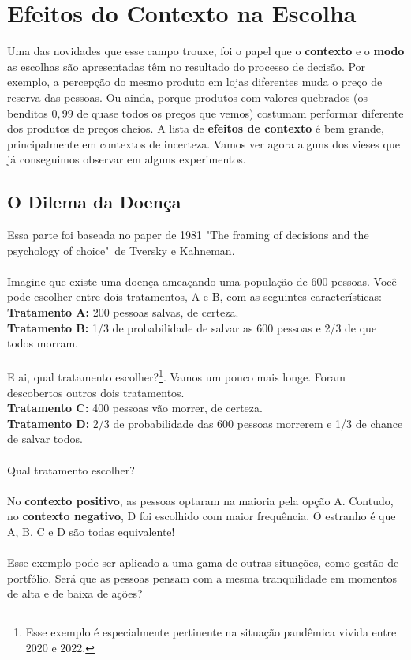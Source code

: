 \documentclass[a4paper,11pt,oneside]{book}
\theoremstyle{definition}
\theoremstyle{break}
\begin{document}
\section{Efeitos do Contexto na Escolha}

Uma das novidades que esse campo trouxe, foi o papel que o \textbf{contexto} e o \textbf{modo} as escolhas são apresentadas têm no resultado do processo de decisão. Por exemplo, a percepção do mesmo produto em lojas diferentes muda o preço de reserva das pessoas. Ou ainda, porque produtos com valores quebrados (os benditos $0,99$ de quase todos os preços que vemos) costumam performar diferente dos produtos de preços cheios. A lista de \textbf{efeitos de contexto} é bem grande, principalmente em contextos de incerteza. Vamos ver agora alguns dos vieses que já conseguimos observar em alguns experimentos. 

\subsection{O Dilema da Doença}

Essa parte foi baseada no paper de 1981 "The framing of decisions and the psychology of choice"\ de Tversky e Kahneman.
\\
\\
Imagine que existe uma doença ameaçando uma população de 600 pessoas. Você pode escolher entre dois tratamentos, A e B, com as seguintes características:
\\
\textbf{Tratamento A:} 200 pessoas salvas, de certeza.\\
\textbf{Tratamento B:} 1/3 de probabilidade de salvar as 600 pessoas e 2/3 de que todos morram.
\\
\\
E ai, qual tratamento escolher?\footnote{Esse exemplo é especialmente pertinente na situação pandêmica vivida entre 2020 e 2022.}. Vamos um pouco mais longe. Foram descobertos outros dois tratamentos.
\\
\textbf{Tratamento C:} 400 pessoas vão morrer, de certeza.\\
\textbf{Tratamento D:} 2/3 de probabilidade das 600 pessoas morrerem e 1/3 de chance de salvar todos.
\\
\\
Qual tratamento escolher?
\\
\\
No \textbf{contexto positivo}, as pessoas optaram na maioria pela opção A. Contudo, no \textbf{contexto negativo}, D foi escolhido com maior frequência. O estranho é que A, B, C e D são todas equivalente!
\\
\\
Esse exemplo pode ser aplicado a uma gama de outras situações, como gestão de portfólio. Será que as pessoas pensam com a mesma tranquilidade em momentos de alta e de baixa de ações?
\end{document}
